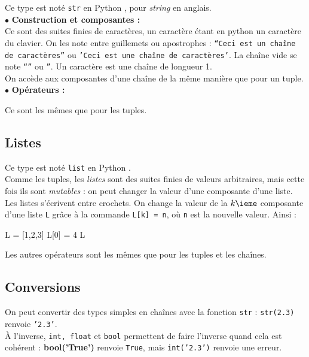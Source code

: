 Ce type est noté \texttt{str} en Python , pour \emph{string} en anglais.\\

\noindent$\bullet$ \textbf{Construction et composantes :}\\


Ce sont des suites finies de caractères, un caractère étant en python un caractère du clavier. On 
les note entre guillemets ou apostrophes : \texttt{``Ceci est un chaîne de caractères''} ou  
\texttt{'Ceci est une chaîne de caractères'}. La chaîne vide se note \texttt{``}\texttt{''} ou 
\texttt{''}. Un caractère est une chaîne de longueur 1.\\
On accède aux composantes d'une chaîne de la même manière que pour un tuple.\\

\noindent$\bullet$ \textbf{Opérateurs :}

Ce sont les mêmes que pour les tuples.

\subsection{Listes}

Ce type est noté \texttt{list} en Python .\\

Comme les tuples, les \emph{listes} sont des suites finies de valeurs arbitraires, mais cette fois 
ils sont \emph{mutables} : on peut changer la valeur d'une composante d'une liste.\\
Les listes s'écrivent entre crochets. On change la valeur de la $k\ieme$ composante d'une liste 
\texttt{L} grâce à la commande \texttt{L[k] = n}, où \texttt{n} est la nouvelle valeur. Ainsi :\\
\begin{pyconsole}
L = [1,2,3] 
L[0] = 4  
L 
\end{pyconsole}

Les autres opérateurs sont les mêmes que pour les tuples et les chaînes.

\subsection{Conversions}

On peut convertir des types simples en chaînes avec la fonction \texttt{str} : \texttt{str(2.3)} 
renvoie \texttt{'2.3'}.\\
À l'inverse, \texttt{int, float} et \texttt{bool} permettent de faire l'inverse quand cela est 
cohérent : \textbf{bool('True')} renvoie \texttt{True}, mais \texttt{int('2.3')} renvoie une 
erreur.\\

